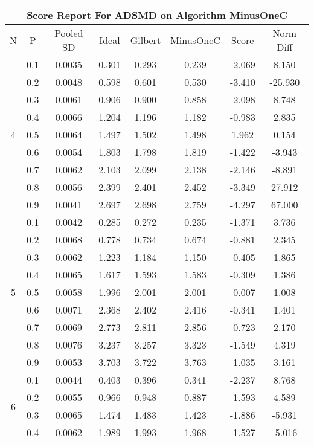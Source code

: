 \documentclass[11pt,a4paper]{report}
\begin{document}
\begin{longtable}{ | c | c || c | c | c | c | c | c | }
\hline
\multicolumn{8}{|c|}{ Score Report For ADSMD on Algorithm MinusOneC} \\
\hline
N & P & Pooled SD &  Ideal &  Gilbert & MinusOneC  & Score & Norm Diff \\
 \hline
 \hline
 \endhead
\multirow{9}{*}{4} & 0.1 & 0.0035 & 0.301 & 0.293 & 0.239 & -2.069 & 8.150 \\
 & 0.2 & 0.0048 & 0.598 & 0.601 & 0.530 & -3.410 & -25.930 \\
 & 0.3 & 0.0061 & 0.906 & 0.900 & 0.858 & -2.098 & 8.748 \\
 & 0.4 & 0.0066 & 1.204 & 1.196 & 1.182 & -0.983 & 2.835 \\
 & 0.5 & 0.0064 & 1.497 & 1.502 & 1.498 & 1.962 & 0.154 \\
 & 0.6 & 0.0054 & 1.803 & 1.798 & 1.819 & -1.422 & -3.943 \\
 & 0.7 & 0.0062 & 2.103 & 2.099 & 2.138 & -2.146 & -8.891 \\
 & 0.8 & 0.0056 & 2.399 & 2.401 & 2.452 & -3.349 & 27.912 \\
 & 0.9 & 0.0041 & 2.697 & 2.698 & 2.759 & -4.297 & 67.000 \\
 \hline
\multirow{9}{*}{5} & 0.1 & 0.0042 & 0.285 & 0.272 & 0.235 & -1.371 & 3.736 \\
 & 0.2 & 0.0068 & 0.778 & 0.734 & 0.674 & -0.881 & 2.345 \\
 & 0.3 & 0.0062 & 1.223 & 1.184 & 1.150 & -0.405 & 1.865 \\
 & 0.4 & 0.0065 & 1.617 & 1.593 & 1.583 & -0.309 & 1.386 \\
 & 0.5 & 0.0058 & 1.996 & 2.001 & 2.001 & -0.007 & 1.008 \\
 & 0.6 & 0.0071 & 2.368 & 2.402 & 2.416 & -0.341 & 1.401 \\
 & 0.7 & 0.0069 & 2.773 & 2.811 & 2.856 & -0.723 & 2.170 \\
 & 0.8 & 0.0076 & 3.237 & 3.257 & 3.323 & -1.549 & 4.319 \\
 & 0.9 & 0.0053 & 3.703 & 3.722 & 3.763 & -1.035 & 3.161 \\
 \hline
\multirow{9}{*}{6} & 0.1 & 0.0044 & 0.403 & 0.396 & 0.341 & -2.237 & 8.768 \\
 & 0.2 & 0.0055 & 0.966 & 0.948 & 0.887 & -1.593 & 4.589 \\
 & 0.3 & 0.0065 & 1.474 & 1.483 & 1.423 & -1.886 & -5.931 \\
 & 0.4 & 0.0062 & 1.989 & 1.993 & 1.968 & -1.527 & -5.016 \\

\end{longtable}
\end{document}
